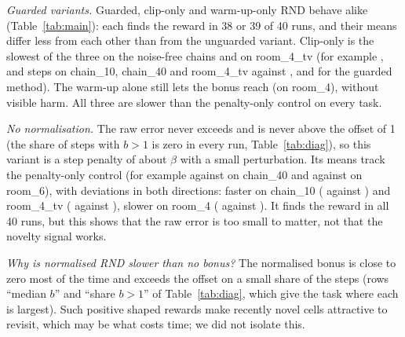 \emph{Guarded variants.} Guarded, clip-only and warm-up-only RND behave alike (Table~\ref{tab:main}): each finds the reward in 38 or 39 of 40 runs, and their means differ less from each other than from the unguarded variant. Clip-only is the slowest of the three on the noise-free chains and on room\_4\_tv (for example ,  and  steps on chain\_10, chain\_40 and room\_4\_tv against ,  and  for the guarded method). The warm-up alone still lets the bonus reach  (on room\_4), without visible harm. All three are slower than the penalty-only control on every task.

\emph{No normalisation.} The raw error never exceeds  and is never above the offset of 1 (the share of steps with $b>1$ is zero in every run, Table~\ref{tab:diag}), so this variant is a step penalty of about $\beta$ with a small perturbation. Its means track the penalty-only control (for example  against  on chain\_40 and  against  on room\_6), with deviations in both directions: faster on chain\_10 ( against ) and room\_4\_tv ( against ), slower on room\_4 ( against ). It finds the reward in all 40 runs, but this shows that the raw error is too small to matter, not that the novelty signal works.

\emph{Why is normalised RND slower than no bonus?} The normalised bonus is close to zero most of the time and exceeds the offset on a small share of the steps (rows ``median $b$'' and ``share $b>1$'' of Table~\ref{tab:diag}, which give the task where each is largest). Such positive shaped rewards make recently novel cells attractive to revisit, which may be what costs time; we did not isolate this.

